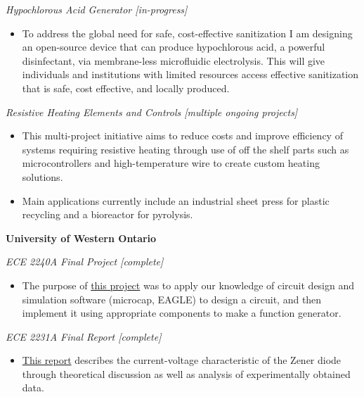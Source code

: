 \documentclass[
]{article}
\begin{document}
\emph{Hypochlorous Acid Generator {[}in-progress{]}}

\begin{itemize}
      \item
            To address the global need for safe, cost-effective sanitization I am
            designing an open-source device that can produce hypochlorous acid, a
            powerful disinfectant, via membrane-less microfluidic electrolysis.
            This will give individuals and institutions with limited resources
            access effective sanitization that is safe, cost effective, and
            locally produced.
\end{itemize}

\emph{Resistive Heating Elements and Controls {[}multiple ongoing
projects{]}}

\begin{itemize}
      \item
            This multi-project initiative aims to reduce costs and improve
            efficiency of systems requiring resistive heating through use of off
            the shelf parts such as microcontrollers and high-temperature wire to
            create custom heating solutions.
      \item
            Main applications currently include an industrial sheet press for
            plastic recycling and a bioreactor for pyrolysis.
\end{itemize}

\textbf{University of Western Ontario}

\emph{ECE 2240A Final Project {[}complete{]}}

\begin{itemize}
      \item
            The purpose of
            \href{https://drive.google.com/file/d/1An5rJPhcd0g3xI0Vsjve0MKh0RhyBITk/view?usp=sharing}{this
                  project} was to apply our knowledge of circuit design and simulation
            software (microcap, EAGLE) to design a circuit, and then implement it
            using appropriate components to make a function generator.
\end{itemize}

\emph{ECE 2231A Final Report {[}complete{]}}

\begin{itemize}
      \item
            \href{file:///G:/Applications/Resumes/•\%09https:/drive.google.com/file/d/17ikyDcy2dAAxGbxkXLpNu5Zhl9YPJUlv/view\%3fusp=sharing}{This
                  report} describes the current-voltage characteristic of the Zener
            diode through theoretical discussion as well as analysis of
            experimentally obtained data.
\end{itemize}
\end{document}
